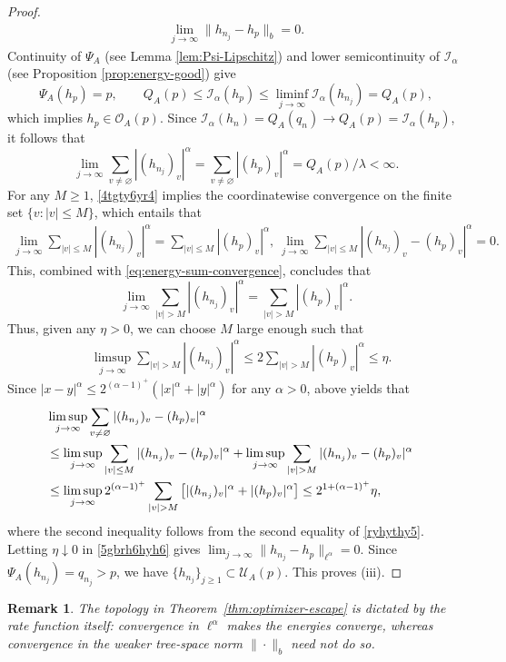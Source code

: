 \documentclass[a4paper, 11pt]{article}
\newcommand{\1}{\mathbf 1}
\theoremstyle{plain}
\newtheorem{remark}{Remark}[section]
\begin{document}
\begin{proof}
\begin{align}
  \lim_{j\to\infty}\|h_{n_j}-h_p\|_b=0.
\end{align}
Continuity of \(\Psi_A\) (see Lemma \ref{lem:Psi-Lipschitz}) and lower
semicontinuity of \(\mathcal{I_{\alpha}}\) (see Proposition \ref{prop:energy-good}) give
\[
  \Psi_A(h_p)=p,
  \qquad
  Q_A(p)\leq\mathcal{I_{\alpha}}(h_p)
  \leq\liminf_{j\to\infty}\mathcal{I_{\alpha}}(h_{n_j})=Q_A(p),
\]
which implies \(h_p\in\mathcal O_A(p)\). Since $\mathcal{I_{\alpha}}(h_n)=Q_A(q_n)\to Q_A(p)=\mathcal{I_{\alpha}}(h_p)$, it follows that
\begin{equation}\label{eq:energy-sum-convergence}
  \lim_{j\to\infty}\sum_{v\neq\varnothing}|(h_{n_j})_v|^\alpha=
  \sum_{v\neq\varnothing}|(h_p)_v|^\alpha=Q_A(p)/\lambda<\infty.
\end{equation}
For any $M\geq1$, \eqref{4tgty6yr4} implies the coordinatewise convergence on the
finite set \(\{v:|v|\leq M\}\), which entails that
\begin{align}\label{ryhythy5}
  \lim_{j\to\infty}\sum_{|v|\leq M}|(h_{n_j})_v|^\alpha=\sum_{|v|\leq M}|(h_p)_v|^\alpha,~\lim_{j\to\infty}\sum_{|v|\leq M}|(h_{n_j})_v-(h_{p})_v|^\alpha=0.
\end{align}
This, combined with \eqref{eq:energy-sum-convergence}, concludes that
\[
  \lim_{j\to\infty}\sum_{|v|> M}|(h_{n_j})_v|^\alpha=\sum_{|v|> M}|(h_p)_v|^\alpha.
  \]
Thus, given any \(\eta>0\), we can choose \(M\) large enough such that
\begin{align}
&\limsup_{j\to\infty}\sum_{|v|>M}|(h_{n_j})_v|^\alpha\leq2\sum_{|v|>M}|(h_p)_v|^\alpha\leq\eta.\nonumber
\end{align}
Since $|x-y|^\alpha\leq 2^{(\alpha-1)^+}(|x|^\alpha+|y|^\alpha)$ for any $\alpha>0$, above yields that
\begin{align}\label{5gbrh6hyh6}
  &\limsup_{j\to\infty}
  \sum_{v\neq\varnothing}|(h_{n_j})_v-(h_p)_v|^\alpha\cr
 &\leq  \limsup_{j\to\infty}
  \sum_{|v|\leq M}|(h_{n_j})_v-(h_p)_v|^\alpha +\limsup_{j\to\infty}
  \sum_{|v|>M}|(h_{n_j})_v-(h_p)_v|^\alpha \cr
   &\leq \limsup_{j\to\infty}
  2^{(\alpha-1)^+}\sum_{|v|>M}\left[|(h_{n_j})_v|^\alpha+|(h_p)_v|^\alpha\right]\leq2^{1+(\alpha-1)^+}\eta,
\end{align}
where the second inequality follows from the second equality of \eqref{ryhythy5}.
Letting \(\eta\downarrow0\) in \eqref{5gbrh6hyh6} gives
\(\lim_{j\to\infty}\|h_{n_j}-h_p\|_{\ell^\alpha}=0\). Since
\(\Psi_A(h_{n_j})=q_{n_j}>p\), we have \(\{h_{n_j}\}_{j\geq1}\subset\mathcal U_A(p)\). This proves \textup{(iii)}.
\end{proof}
\begin{remark}
The topology in Theorem~\ref{thm:optimizer-escape} is dictated by the rate
function itself: convergence in \(\ell^\alpha\) makes the energies converge,
whereas convergence in the weaker tree-space norm \(\|\cdot\|_b\) need
not do so.
\end{remark}
\end{document}

